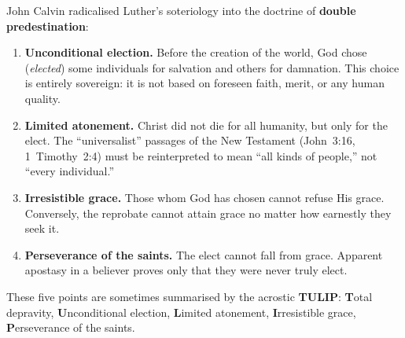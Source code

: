 \documentclass[11pt,twoside]{article}
\begin{document}
\begin{scheda}

John Calvin radicalised Luther's soteriology into the
doctrine of \textbf{double predestination}:

\begin{enumerate}
  \item \textbf{Unconditional election.}
    Before the creation of the world, God chose (\emph{elected}) some
    individuals for salvation and others for damnation.  This choice is
    entirely sovereign: it is not based on foreseen faith, merit, or any
    human quality.
  \item \textbf{Limited atonement.}
    Christ did not die for all humanity, but only for the elect.
    The ``universalist'' passages of the New Testament
    (John~3:16, 1~Timothy~2:4) must be reinterpreted to mean ``all kinds
    of people,'' not ``every individual.''
  \item \textbf{Irresistible grace.}
    Those whom God has chosen cannot refuse His grace.  Conversely, the
    reprobate cannot attain grace no matter how earnestly
    they seek it.
  \item \textbf{Perseverance of the saints.}
    The elect cannot fall from grace.  Apparent apostasy in a believer
    proves only that they were never truly elect.
\end{enumerate}

These five points are sometimes summarised by the acrostic
\textbf{TULIP}:\linebreak
\textbf{T}otal depravity,
\textbf{U}nconditional election,
\textbf{L}imited atonement,
\textbf{I}rresistible grace,
\textbf{P}erseverance of the saints.
\end{scheda}
\end{document}
